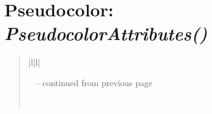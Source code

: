 \documentclass[letterpaper,10pt,english]{sphinxmanual}
\begin{document}
\section{\textbf{Pseudocolor}: \emph{PseudocolorAttributes()}}
\label{attributes:pseudocolor-pseudocolorattributes}
\begin{DUlineblock}{0em}
\item[] 
\end{DUlineblock}
\begin{quote}

\begin{longtable}{|l|l|}
\hline
\endfirsthead

%
{{\textsf{\tablename\ \thetable{} -- continued from previous page}}} \\
\hline
\endhead

\hline {} \\ \hline
\endfoot

\endlastfoot



\end{longtable}
\end{quote}
\end{document}
